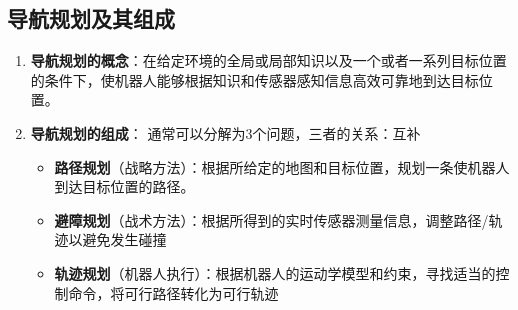 \documentclass[../main.tex]{subfiles}
\begin{document}
\subsection{导航规划及其组成}\label{subsec:navigation_planning}
\begin{enumerate}
    \item \textbf{导航规划的概念}：在给定环境的全局或局部知识以及一个或者一系列目标位置的条件下，使机器人能够根据知识和传感器感知信息高效可靠地到达目标位置。
    \item \textbf{导航规划的组成}：
    通常可以分解为3个问题，三者的关系：互补
    \begin{itemize}
        \item \textbf{路径规划}（战略方法）：根据所给定的地图和目标位置，规划一条使机器人到达目标位置的路径。
        \item \textbf{避障规划}（战术方法）：根据所得到的实时传感器测量信息，调整路径/轨迹以避免发生碰撞
        \item \textbf{轨迹规划}（机器人执行）：根据机器人的运动学模型和约束，寻找适当的控制命令，将可行路径转化为可行轨迹
    \end{itemize}
\end{enumerate}
\end{document}

